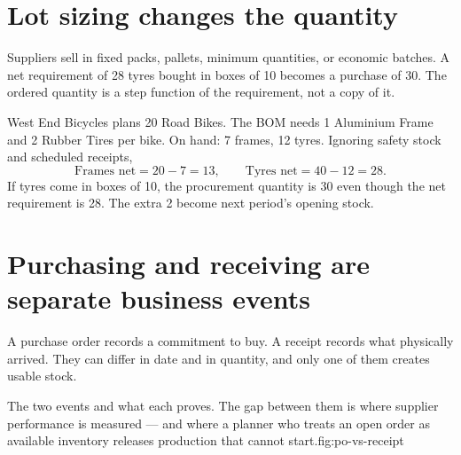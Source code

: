 \section{Lot sizing changes the quantity}

Suppliers sell in fixed packs, pallets, minimum quantities, or economic batches.
A net requirement of 28 tyres bought in boxes of 10 becomes a purchase of 30. The
ordered quantity is a step function of the requirement, not a copy of it.

\begin{workedexample}
West End Bicycles plans 20 Road Bikes. The BOM needs 1 Aluminium Frame and 2
Rubber Tires per bike. On hand: 7 frames, 12 tyres. Ignoring safety stock and
scheduled receipts,
\[
\text{Frames net}=20-7=13,\qquad \text{Tyres net}=40-12=28.
\]
If tyres come in boxes of 10, the procurement quantity is 30 even though the net
requirement is 28. The extra 2 become next period's opening stock.
\end{workedexample}

\section{Purchasing and receiving are separate business events}

A purchase order records a commitment to buy. A receipt records what physically
arrived. They can differ in date and in quantity, and only one of them creates
usable stock.

\begin{utpfig}{The two events and what each proves. The
gap between them is where supplier performance is measured --- and where a
planner who treats an open order as available inventory releases production that
cannot start.}{fig:po-vs-receipt}
\end{utpfig}

